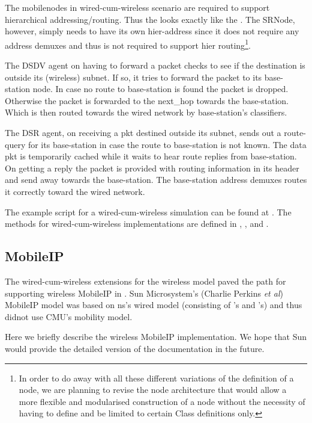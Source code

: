 {The mobilenodes in wired-cum-wireless scenario are required to support
hierarchical addressing/routing. Thus the  looks
exactly like the . The SRNode, however, simply
needs to have its own hier-address since it does not require any
address demuxes and thus is not required to support hier
routing\footnote{In order to do away with all these different
  variations of the definition of a node, we are planning to revise
  the node architecture that would allow a more flexible
  and modularised construction of a node without the necessity of having
  to define and be limited to certain Class definitions only.}.

The DSDV agent on having to forward a packet checks to see if the
destination is outside its (wireless) subnet. If so, it tries to
forward the packet to its base-station node. In case no route to
base-station is found the packet is dropped. Otherwise the
packet is forwarded to the next\_hop towards the base-station. Which
is then routed towards the wired network by base-station's
classifiers.

The DSR agent, on receiving a pkt destined outside its subnet, sends
out a route-query for its base-station in case the route to
base-station is not known. The data pkt is temporarily cached while it
waits to hear route replies from base-station. On getting a reply the
packet is provided with routing information in its header and send
away towards the base-station. The base-station address demuxes routes
it correctly toward the wired network.

The example script for a wired-cum-wireless simulation can be found at
. The methods for
wired-cum-wireless implementations are defined in
, ,  and
.


\subsection{MobileIP}
\label{sec:mobileip}

The wired-cum-wireless extensions for the wireless model paved the
path for supporting wireless MobileIP in \ns. Sun Microsystem's
(Charlie Perkins {\em et al}) MobileIP model was based on ns's wired model
(consisting of 's and 's) and thus didnot use
CMU's mobility model.

Here we briefly describe the wireless MobileIP implementation. We hope
that Sun would provide the detailed version of the documentation in
the future.

}
